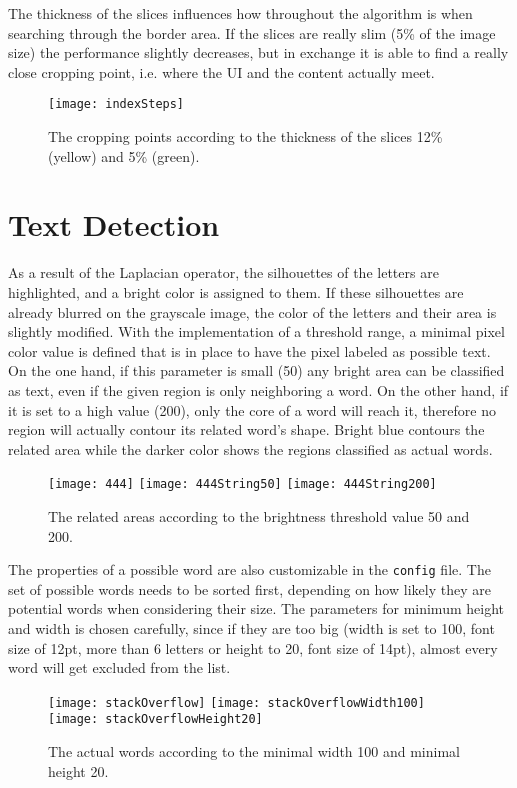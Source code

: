 \documentclass[draft,final]{vutinfth} %
\begin{document}
	The thickness of the slices influences how throughout the algorithm is when searching through the border area.
	If the slices are really slim (5\% of the image size) the performance slightly decreases, but in exchange it is able to find a really close cropping point, i.e. where the UI and the content actually meet.\par
	\begin{figure}[H]
		\centering
		\texttt{[image: indexSteps]}
		\caption{The cropping points according to the thickness of the slices 12\% (yellow) and 5\% (green).}
		\label{fig:res:steps}
	\end{figure}
	\section{Text Detection}
	As a result of the Laplacian operator, the silhouettes of the letters are highlighted, and a bright color is assigned to them. 
	If these silhouettes are already blurred on the grayscale image, the color of the letters and their area is slightly modified. 
	With the implementation of a threshold range, a minimal pixel color value is defined that is in place to have the pixel labeled as possible text.
	On the one hand, if this parameter is small (50) any bright area can be classified as text, even if the given region is only neighboring a word.
	On the other hand, if it is set to a high value (200), only the core of a word will reach it, therefore no region will actually contour its related word's shape.
	Bright blue contours the related area while the darker color shows the regions classified as actual words.\par
	\begin{figure}[H]
		\texttt{[image: 444]}\hfill
		\texttt{[image: 444String50]}\hfill
		\texttt{[image: 444String200]}
		\caption{The related areas according to the brightness threshold value 50 and 200. }
	\end{figure} 
	The properties of a possible word are also customizable in the \texttt{config} file.
	The set of possible words needs to be sorted first, depending on how likely they are potential words when considering their size.
	The parameters for minimum height and width is chosen carefully, since if they are too big (width is set to 100, font size of 12pt, more than 6 letters or height to 20, font size of 14pt), almost every word will get excluded from the list.
	\begin{figure}[H]
		\texttt{[image: stackOverflow]}\hfill
		\texttt{[image: stackOverflowWidth100]}\hfill
		\texttt{[image: stackOverflowHeight20]}
		\caption{The actual words according to the minimal width 100 and minimal height 20. }
	\end{figure}  
\end{document}
